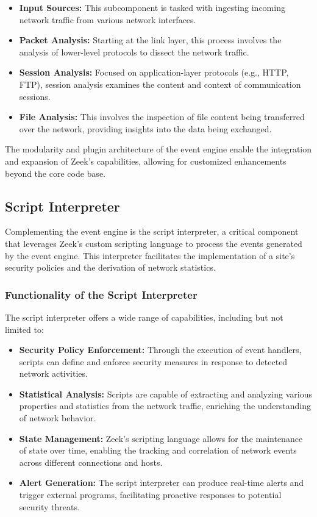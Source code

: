 \begin{itemize}
    \item \textbf{Input Sources:} This subcomponent is tasked with ingesting incoming network traffic from various network interfaces.
    \item \textbf{Packet Analysis:} Starting at the link layer, this process involves the analysis of lower-level protocols to dissect the network traffic.
    \item \textbf{Session Analysis:} Focused on application-layer protocols (e.g., HTTP, FTP), session analysis examines the content and context of communication sessions.
    \item \textbf{File Analysis:} This involves the inspection of file content being transferred over the network, providing insights into the data being exchanged.
\end{itemize}

The modularity and plugin architecture of the event engine enable the integration and expansion of Zeek's capabilities, allowing for customized enhancements beyond the core code base.

\subsection{Script Interpreter}

Complementing the event engine is the script interpreter, a critical component that leverages Zeek's custom scripting language to process the events generated by the event engine. This interpreter facilitates the implementation of a site's security policies and the derivation of network statistics.

\subsubsection{Functionality of the Script Interpreter}

The script interpreter offers a wide range of capabilities, including but not limited to:

\begin{itemize}
    \item \textbf{Security Policy Enforcement:} Through the execution of event handlers, scripts can define and enforce security measures in response to detected network activities.
    \item \textbf{Statistical Analysis:} Scripts are capable of extracting and analyzing various properties and statistics from the network traffic, enriching the understanding of network behavior.
    \item \textbf{State Management:} Zeek's scripting language allows for the maintenance of state over time, enabling the tracking and correlation of network events across different connections and hosts.
    \item \textbf{Alert Generation:} The script interpreter can produce real-time alerts and trigger external programs, facilitating proactive responses to potential security threats.
\end{itemize}



